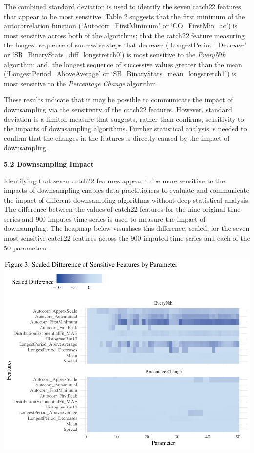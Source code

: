 \documentclass{article}
\begin{document}
\vspace{-3.5cm}

The combined standard deviation is used to identify the seven catch22
features that appear to be most sensitive. Table 2 suggests that the
first minimum of the autocorrelation function (`Autocorr\_FirstMinimum'
or `CO\_FirstMin\_ac') is most sensitive across both of the algorithms;
that the catch22 feature measuring the longest sequence of successive
steps that decrease (`LongestPeriod\_Decrease' or
`SB\_BinaryStats\_diff\_longstretch0') is most sensitive to the
\emph{EveryNth} algorithm; and, the longest sequence of successive
values greater than the mean (`LongestPeriod\_AboveAverage' or
`SB\_BinaryStats\_mean\_longstretch1') is most sensitive to the
\emph{Percentage Change} algorithm.

These results indicate that it may be possible to communicate the impact
of downsampling via the sensitivity of the catch22 features. However,
standard deviation is a limited measure that suggests, rather than
confirms, sensitivity to the impacts of downsampling algorithms. Further
statistical analysis is needed to confirm that the changes in the
features is directly caused by the impact of downsampling.

\textbf{5.2 Downsampling Impact}

Identifying that seven catch22 features appear to be more sensitive to
the impacts of downsampling enables data practitioners to evaluate and
communicate the impact of different downsampling algorithms without deep
statistical analysis. The difference between the values of catch22
features for the nine original time series and 900 imputes time series
is used to measure the impact of downsampling. The heapmap below
visualises this difference, scaled, for the seven most sensitive catch22
features across the 900 imputed time series and each of the 50
parameters.

\includegraphics{210431461_CSC8639_Dissertation_files/figure-latex/Heatmap_param-1.pdf}
\end{document}
